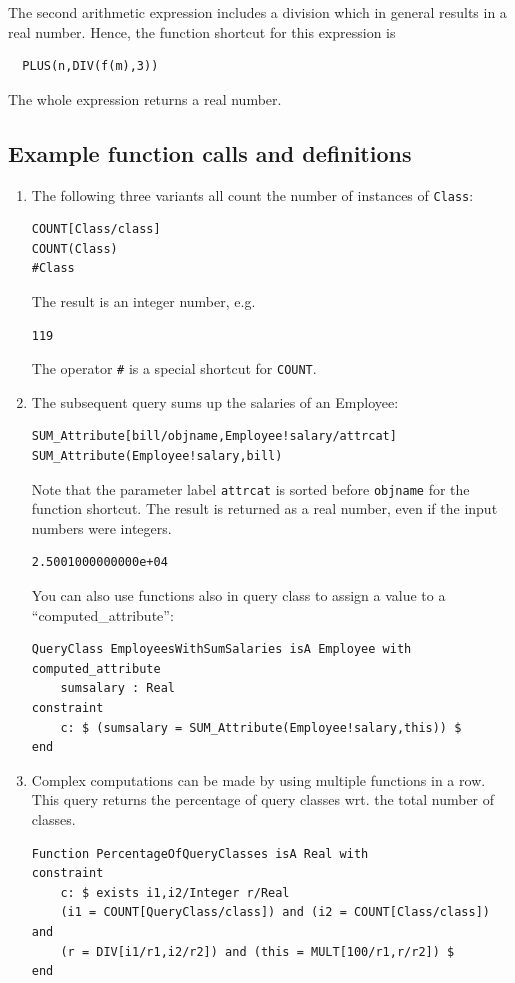 The second arithmetic expression includes a division which in general results in a real number.
Hence, the function shortcut for this expression is

\begin{verbatim}
  PLUS(n,DIV(f(m),3))
\end{verbatim}
The whole expression returns a real number.




\subsection{Example function calls and definitions}

\begin{enumerate}
\item The following three variants all count the number of instances of {\tt Class}:
\begin{verbatim}
COUNT[Class/class]
COUNT(Class)
#Class
\end{verbatim}

The result is an integer number, e.g.\
\begin{verbatim}
119
\end{verbatim}

The operator {\tt \#} is a special shortcut for {\tt COUNT}. 

\item The subsequent query sums up the salaries of an Employee:
\begin{verbatim}
SUM_Attribute[bill/objname,Employee!salary/attrcat]
SUM_Attribute(Employee!salary,bill)
\end{verbatim}


Note that the parameter label {\tt attrcat} is sorted before {\tt objname} for the function shortcut. 
The result is returned as a real number, even if the input numbers were integers.
{\small
\begin{verbatim}
2.5001000000000e+04
\end{verbatim}
}

You can also use functions also in query class to assign a value to a ``computed\_attribute'':
{\small
\begin{verbatim}
QueryClass EmployeesWithSumSalaries isA Employee with
computed_attribute
    sumsalary : Real
constraint
    c: $ (sumsalary = SUM_Attribute(Employee!salary,this)) $
end
\end{verbatim}
}

\item Complex computations can be made by using multiple functions in a row. This query returns the
percentage of query classes wrt. the total number of classes.
{\small
\begin{verbatim}
Function PercentageOfQueryClasses isA Real with
constraint
    c: $ exists i1,i2/Integer r/Real
    (i1 = COUNT[QueryClass/class]) and (i2 = COUNT[Class/class]) and
    (r = DIV[i1/r1,i2/r2]) and (this = MULT[100/r1,r/r2]) $
end
\end{verbatim}
}


\end{enumerate}
